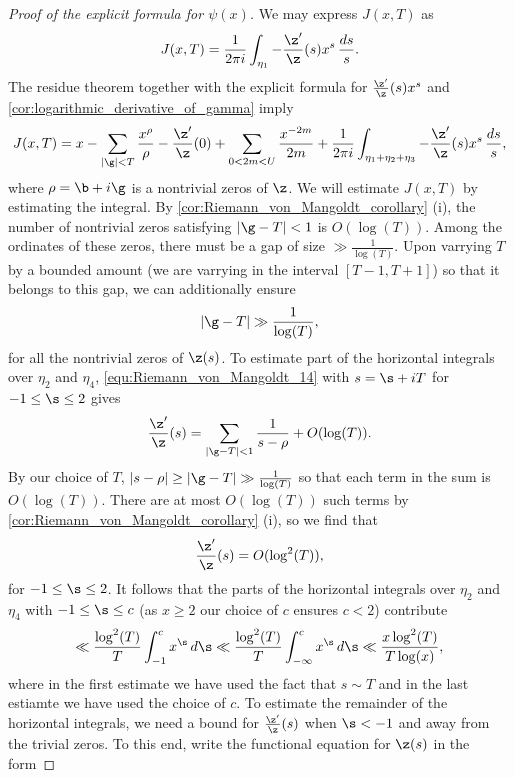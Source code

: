 \begin{proof}[Proof of the explicit formula for $\psi(x)$]
        We may express $J(x,T)$ as
        \[
          J(x,T) = \frac{1}{2\pi i}\int_{\eta_{1}}-\frac{\z'}{\z}(s)x^{s}\,\frac{ds}{s}.
        \]
        The residue theorem together with the explicit formula for $\frac{\z'}{\z}(s)x^{s}$ and \cref{cor:logarithmic_derivative_of_gamma} imply
        \begin{equation}\label{equ:explicit_formula_proof_7}
          J(x,T) = x-\sum_{|\g| < T}\frac{x^{\rho}}{\rho}-\frac{\z'}{\z}(0)+\sum_{0 < 2m < U}\frac{x^{-2m}}{2m}+\frac{1}{2\pi i}\int_{\eta_{1}+\eta_{2}+\eta_{3}}-\frac{\z'}{\z}(s)x^{s}\,\frac{ds}{s},
        \end{equation}
        where $\rho = \b+i\g$ is a nontrivial zeros of $\z$. We will estimate $J(x,T)$ by estimating the integral. By \cref{cor:Riemann_von_Mangoldt_corollary} (i), the number of nontrivial zeros satisfying $|\g-T| < 1$ is $O(\log(T))$. Among the ordinates of these zeros, there must be a gap of size $\gg \frac{1}{\log(T)}$. Upon varrying $T$ by a bounded amount (we are varrying in the interval $[T-1,T+1]$) so that it belongs to this gap, we can additionally ensure
        \[
          |\g-T| \gg \frac{1}{\log(T)},
        \]
        for all the nontrivial zeros of $\z(s)$. To estimate part of the horizontal integrals over $\eta_{2}$ and $\eta_{4}$, \cref{equ:Riemann_von_Mangoldt_14} with $s = \s+iT$ for $-1 \le \s \le 2$ gives
        \[
          \frac{\z'}{\z}(s) = \sum_{|\g-T| < 1}\frac{1}{s-\rho}+O(\log(T)).
        \]
        By our choice of $T$, $|s-\rho| \ge |\g-T| \gg \frac{1}{\log(T)}$ so that each term in the sum is $O(\log(T))$. There are at most $O(\log(T))$ such terms by \cref{cor:Riemann_von_Mangoldt_corollary} (i), so we find that
        \[
          \frac{\z'}{\z}(s) = O(\log^{2}(T)),
        \]
        for $-1 \le \s \le 2$. It follows that the parts of the horizontal integrals over $\eta_{2}$ and $\eta_{4}$ with  $-1 \le \s \le c$ (as $x \ge 2$ our choice of $c$ ensures $c < 2$) contribute
        \begin{equation}\label{equ:explicit_formula_proof_8}
          \ll \frac{\log^{2}(T)}{T}\int_{-1}^{c}x^{\s}\,d\s \ll \frac{\log^{2}(T)}{T}\int_{-\infty}^{c}x^{\s}\,d\s \ll \frac{x\log^{2}(T)}{T\log(x)},
        \end{equation}
        where in the first estimate we have used the fact that $s \sim T$ and in the last estiamte we have used the choice of $c$. To estimate the remainder of the horizontal integrals, we need a bound for $\frac{\z'}{\z}(s)$ when $\s < -1$ and away from the trivial zeros. To this end, write the functional equation for $\z(s)$ in the form

\end{proof}
